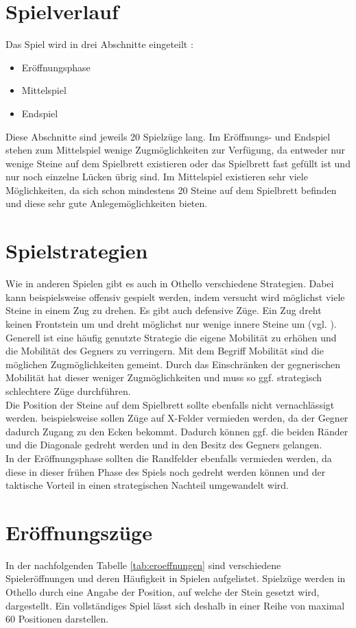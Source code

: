 \section{Spielverlauf}
Das Spiel wird in drei Abschnitte eingeteilt \cite{Ortiz.}:
\begin{itemize}
\item Eröffnungsphase
\item Mittelspiel
\item Endspiel
\end{itemize}
Diese Abschnitte sind jeweils 20 Spielzüge lang.
Im Eröffnungs- und Endspiel stehen zum Mittelspiel wenige Zugmöglichkeiten zur Verfügung, da entweder nur wenige Steine auf dem Spielbrett existieren oder das Spielbrett fast gefüllt ist und nur noch einzelne Lücken übrig sind. Im Mittelspiel existieren sehr viele Möglichkeiten, da sich schon mindestens 20 Steine auf dem Spielbrett befinden und diese sehr gute Anlegemöglichkeiten bieten. 
\section{Spielstrategien}
Wie in anderen Spielen gibt es auch in Othello verschiedene Strategien. Dabei kann beispielsweise offensiv gespielt werden, indem versucht wird möglichst viele Steine in einem Zug zu drehen. Es gibt auch defensive  Züge. Ein  Zug dreht keinen Frontstein um und dreht möglichst nur wenige innere Steine um (vgl. \cite{Ortiz.}).
\\ Generell ist eine häufig genutzte Strategie die eigene Mobilität zu erhöhen und die Mobilität des Gegners zu verringern. Mit dem Begriff Mobilität sind die möglichen Zugmöglichkeiten gemeint. Durch das Einschränken der gegnerischen Mobilität hat dieser weniger Zugmöglichkeiten und muss so ggf. strategisch schlechtere Züge durchführen.
\\Die Position der Steine auf dem Spielbrett sollte ebenfalls nicht vernachlässigt werden.
beispielsweise sollen Züge auf X-Felder vermieden werden, da der Gegner dadurch Zugang zu den Ecken bekommt. Dadurch können ggf. die beiden Ränder und die Diagonale gedreht werden und in den Besitz des Gegners gelangen.
\\In der Eröffnungsphase sollten die Randfelder ebenfalls vermieden werden, da diese in dieser frühen Phase des Spiels noch gedreht werden können und der taktische Vorteil in einen strategischen Nachteil umgewandelt wird.
\section{Eröffnungszüge}
\label{othello-eroff}
In der nachfolgenden Tabelle \ref{tab:eroeffnungen} sind verschiedene Spieleröffnungen und deren Häufigkeit in Spielen aufgelistet. Spielzüge werden in Othello durch eine Angabe der Position, auf welche der Stein gesetzt wird, dargestellt. Ein vollständiges Spiel lässt sich deshalb in einer Reihe von maximal 60 Positionen darstellen.

